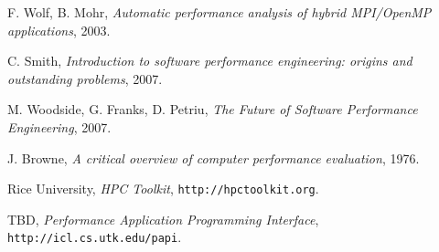 \documentclass[a4paper,twocolumn]{article}
\begin{document}
\begin{thebibliography}{9}
 F. Wolf, B. Mohr,
 \emph{Automatic performance analysis of hybrid MPI/OpenMP applications},
 2003.

 C. Smith,
 \emph{Introduction to software performance engineering: origins and outstanding problems},
 2007.

 M. Woodside, G. Franks, D. Petriu,
 \emph{The Future of Software Performance Engineering},
 2007.

 J. Browne,
 \emph{A critical overview of computer performance evaluation},
 1976.

  Rice University,
 \emph{HPC Toolkit},
 {\tt http://hpctoolkit.org}.

  TBD,
  \emph{Performance Application Programming Interface},
  {\tt http://icl.cs.utk.edu/papi}.


\end{thebibliography}
\end{document}
